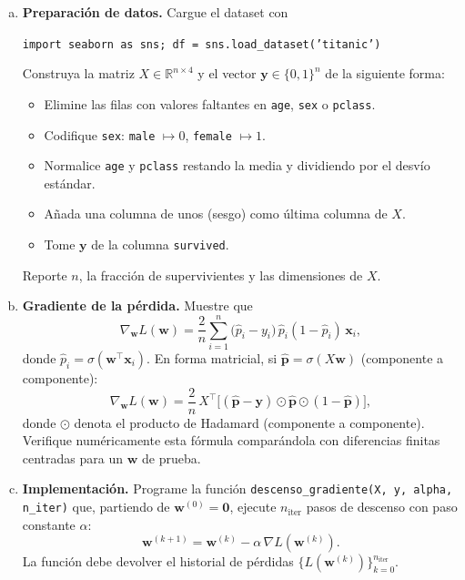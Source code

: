 \documentclass[12pt]{article}
\newcommand{\R}{\mathbb{R}}
\begin{document}
\begin{enumerate}[(a)]
  \item \textbf{Preparación de datos.} Cargue el dataset con
    \begin{center}
      \texttt{import seaborn as sns; df = sns.load\_dataset('titanic')}
    \end{center}
    Construya la matriz $X \in \R^{n \times 4}$ y el vector $\mathbf{y} \in \{0,1\}^n$ de la siguiente forma:
    \begin{itemize}
      \item Elimine las filas con valores faltantes en \texttt{age}, \texttt{sex} o \texttt{pclass}.
      \item Codifique \texttt{sex}: \texttt{male} $\mapsto 0$, \texttt{female} $\mapsto 1$.
      \item Normalice \texttt{age} y \texttt{pclass} restando la media y dividiendo por el desvío estándar.
      \item Añada una columna de unos (sesgo) como última columna de $X$.
      \item Tome $\mathbf{y}$ de la columna \texttt{survived}.
    \end{itemize}
    Reporte $n$, la fracción de supervivientes y las dimensiones de $X$.

  \item \textbf{Gradiente de la pérdida.} Muestre que
    \[
      \nabla_{\mathbf{w}} L(\mathbf{w})
        = \frac{2}{n} \sum_{i=1}^{n}
          \bigl(\hat{p}_i - y_i\bigr)\, \hat{p}_i(1 - \hat{p}_i)\, \mathbf{x}_i,
    \]
    donde $\hat{p}_i = \sigma(\mathbf{w}^\top \mathbf{x}_i)$.
    En forma matricial, si $\hat{\mathbf{p}} = \sigma(X\mathbf{w})$ (componente a componente):
    \[
      \nabla_{\mathbf{w}} L(\mathbf{w})
        = \frac{2}{n}\, X^\top \bigl[(\hat{\mathbf{p}} - \mathbf{y}) \odot
          \hat{\mathbf{p}} \odot (1 - \hat{\mathbf{p}})\bigr],
    \]
    donde $\odot$ denota el producto de Hadamard (componente a componente).
    Verifique numéricamente esta fórmula comparándola con diferencias finitas centradas
    para un $\mathbf{w}$ de prueba.

  \item \textbf{Implementación.} Programe la función
    \texttt{descenso\_gradiente(X, y, alpha, n\_iter)} que, partiendo de $\mathbf{w}^{(0)} = \mathbf{0}$,
    ejecute $n_{\mathrm{iter}}$ pasos de descenso con paso constante $\alpha$:
    \[
      \mathbf{w}^{(k+1)} = \mathbf{w}^{(k)} - \alpha \,\nabla L\!\left(\mathbf{w}^{(k)}\right).
    \]
    La función debe devolver el historial de pérdidas $\{L(\mathbf{w}^{(k)})\}_{k=0}^{n_{\mathrm{iter}}}$.


\end{enumerate}
\end{document}
